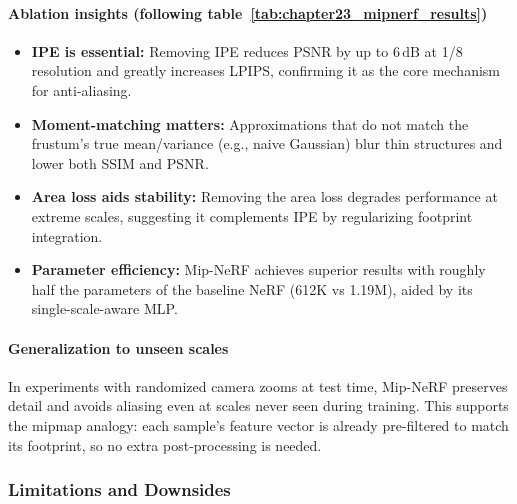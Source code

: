\begin{enrichment}
\begin{enrichment}
    \paragraph{Ablation insights (following table~\ref{tab:chapter23_mipnerf_results})}
    \begin{itemize}
        \item \textbf{IPE is essential:} Removing IPE reduces PSNR by up to \(6\,\mathrm{dB}\) at 1/8 resolution and greatly increases LPIPS, confirming it as the core mechanism for anti-aliasing.
        \item \textbf{Moment-matching matters:} Approximations that do not match the frustum’s true mean/variance (e.g., naive Gaussian) blur thin structures and lower both SSIM and PSNR.
        \item \textbf{Area loss aids stability:} Removing the area loss degrades performance at extreme scales, suggesting it complements IPE by regularizing footprint integration.
        \item \textbf{Parameter efficiency:} Mip-NeRF achieves superior results with roughly half the parameters of the baseline NeRF (612K vs 1.19M), aided by its single-scale-aware MLP.
    \end{itemize}
    
    \paragraph{Generalization to unseen scales}
    In experiments with randomized camera zooms at test time, Mip-NeRF preserves detail and avoids aliasing even at scales never seen during training.
    This supports the mipmap analogy: each sample’s feature vector is already pre-filtered to match its footprint, so no extra post-processing is needed.
    
    \subsubsection{Limitations and Downsides}
    \label{subsec:chapter23_mipnerf_limitations}
    

\end{enrichment}
\end{enrichment}
